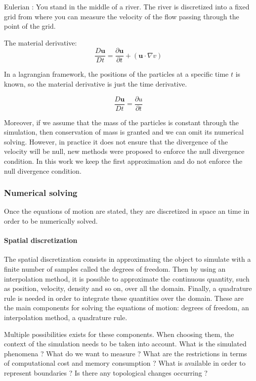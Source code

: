 Eulerian : You stand in the middle of a river. The river is discretized into a fixed grid from where you can measure the velocity of the flow passing through the point of the grid.

The material derivative:
\begin{equation}
\frac{D\mathbf{u}}{Dt} = \frac{\partial \mathbf{u}}{\partial t} + (\mathbf{u} \cdot \nabla v)
\end{equation}

In a lagrangian framework, the positions of the particles at a specific time $t$ is known, so the material derivative is just the time derivative.

\begin{equation}
\frac{D\mathbf{u}}{Dt} = \frac{\partial u}{\partial t}
\end{equation}

Moreover, if we assume that the mass of the particles is constant through the simulation, then conservation of mass is granted and we can omit its numerical solving. However, in practice it does not ensure that the divergence of the velocity will be null, new methods were proposed to enforce the null divergence condition. In this work we keep the first approximation and do not enforce the null divergence condition.

\subsubsection{Numerical solving}

Once the equations of motion are stated, they are discretized in space an time in order to be numerically solved.

\paragraph{Spatial discretization}

The spatial discretization consists in approximating the object to simulate with a finite number of samples called the degrees of freedom. Then by using an interpolation method, it is possible to approximate the continuous quantity, such as position, velocity, density and so on, over all the domain. Finally, a quadrature rule is needed in order to integrate these quantities over the domain. These are the main components for solving the equations of motion:
degrees of freedom, an interpolation method, a quadrature rule. 

Multiple possibilities exists for these components. When choosing them, the context of the simulation needs to be taken into account.
What is the simulated phenomena ?
What do we want to measure ?
What are the restrictions in terms of computational cost and memory consumption ?
What is available in order to represent boundaries ?
Is there any topological changes occurring ?

